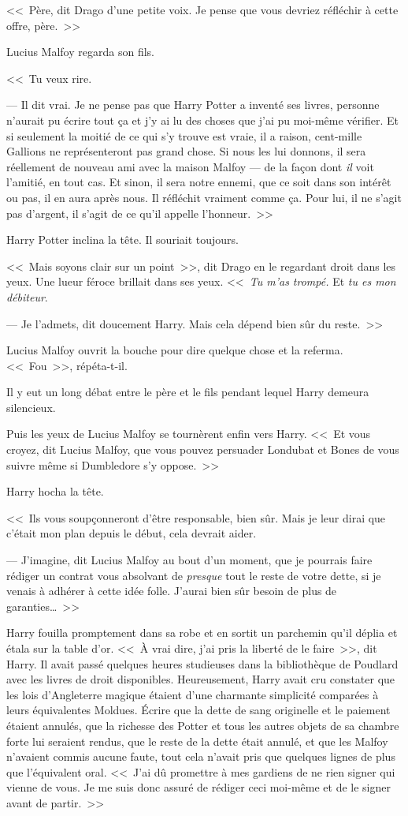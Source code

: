 <<~Père, dit Drago d'une petite voix. Je pense que vous devriez réfléchir à cette offre, père.~>>

Lucius Malfoy regarda son fils.

<<~Tu veux rire.

--- Il dit vrai. Je ne pense pas que Harry Potter a inventé ses livres, personne n'aurait pu écrire tout ça et j'y ai lu des choses que j'ai pu moi-même vérifier. Et si seulement la moitié de ce qui s'y trouve est vraie, il a raison, cent-mille Gallions ne représenteront pas grand chose. Si nous les lui donnons, il sera réellement de nouveau ami avec la maison Malfoy — de la façon dont \emph{il} voit l'amitié, en tout cas. Et sinon, il sera notre ennemi, que ce soit dans son intérêt ou pas, il en aura après nous. Il réfléchit vraiment comme ça. Pour lui, il ne s'agit pas d'argent, il s'agit de ce qu'il appelle l'honneur.~>>

Harry Potter inclina la tête. Il souriait toujours.

<<~Mais soyons clair sur un point~>>, dit Drago en le regardant droit dans les yeux. Une lueur féroce brillait dans ses yeux. <<~\emph{Tu m'as trompé.} Et \emph{tu es mon débiteur}.

--- Je l'admets, dit doucement Harry. Mais cela dépend bien sûr du reste.~>>

Lucius Malfoy ouvrit la bouche pour dire quelque chose et la referma. <<~Fou~>>, répéta-t-il.

Il y eut un long débat entre le père et le fils pendant lequel Harry demeura silencieux.

Puis les yeux de Lucius Malfoy se tournèrent enfin vers Harry. <<~Et vous croyez, dit Lucius Malfoy, que vous pouvez persuader Londubat et Bones de vous suivre même si Dumbledore s'y oppose.~>>

Harry hocha la tête.

<<~Ils vous soupçonneront d'être responsable, bien sûr. Mais je leur dirai que c'était mon plan depuis le début, cela devrait aider.

--- J'imagine, dit Lucius Malfoy au bout d'un moment, que je pourrais faire rédiger un contrat vous absolvant de \emph{presque} tout le reste de votre dette, si je venais à adhérer à cette idée folle. J'aurai bien sûr besoin de plus de garanties…~>>

Harry fouilla promptement dans sa robe et en sortit un parchemin qu'il déplia et étala sur la table d'or. <<~À vrai dire, j'ai pris la liberté de le faire~>>, dit Harry. Il avait passé quelques heures studieuses dans la bibliothèque de Poudlard avec les livres de droit disponibles. Heureusement, Harry avait cru constater que les lois d'Angleterre magique étaient d'une charmante simplicité comparées à leurs équivalentes Moldues. Écrire que la dette de sang originelle et le paiement étaient annulés, que la richesse des Potter et tous les autres objets de sa chambre forte lui seraient rendus, que le reste de la dette était annulé, et que les Malfoy n'avaient commis aucune faute, tout cela n'avait pris que quelques lignes de plus que l'équivalent oral. <<~J'ai dû promettre à mes gardiens de ne rien signer qui vienne de vous. Je me suis donc assuré de rédiger ceci moi-même et de le signer avant de partir.~>>

